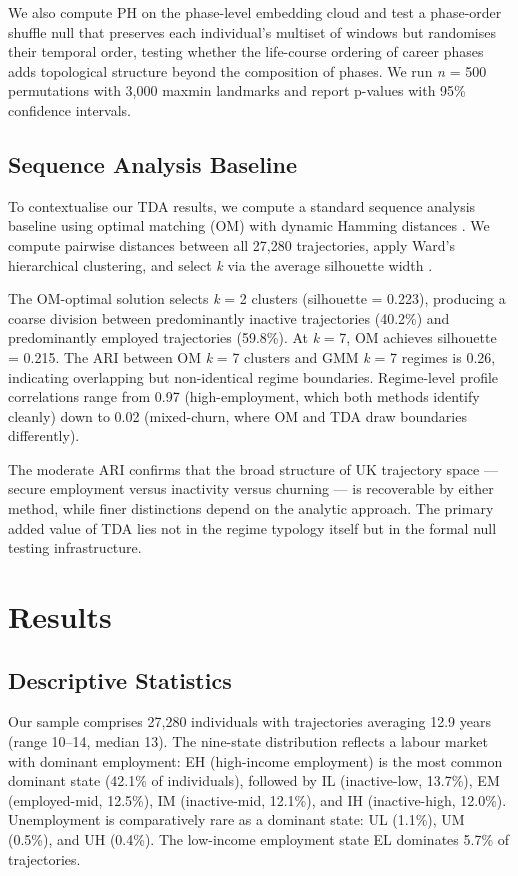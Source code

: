 We also compute PH on the phase-level embedding cloud and test a phase-order shuffle null that preserves each individual's multiset of windows but randomises their temporal order, testing whether the life-course ordering of career phases adds topological structure beyond the composition of phases. We run \textit{n} = 500 permutations with 3,000 maxmin landmarks and report p-values with 95\% confidence intervals.

\subsection{Sequence Analysis Baseline}

To contextualise our TDA results, we compute a standard sequence analysis baseline using optimal matching (OM) with dynamic Hamming distances \citep{lesnard2010setting}. We compute pairwise distances between all 27,280 trajectories, apply Ward's hierarchical clustering, and select \textit{k} via the average silhouette width \citep{studer2016what}.

The OM-optimal solution selects \textit{k} = 2 clusters (silhouette = 0.223), producing a coarse division between predominantly inactive trajectories (40.2\%) and predominantly employed trajectories (59.8\%). At \textit{k} = 7, OM achieves silhouette = 0.215. The ARI between OM \textit{k} = 7 clusters and GMM \textit{k} = 7 regimes is 0.26, indicating overlapping but non-identical regime boundaries. Regime-level profile correlations range from 0.97 (high-employment, which both methods identify cleanly) down to 0.02 (mixed-churn, where OM and TDA draw boundaries differently).

The moderate ARI confirms that the broad structure of UK trajectory space --- secure employment versus inactivity versus churning --- is recoverable by either method, while finer distinctions depend on the analytic approach. The primary added value of TDA lies not in the regime typology itself but in the formal null testing infrastructure.


\section{Results}

\subsection{Descriptive Statistics}

Our sample comprises 27,280 individuals with trajectories averaging 12.9 years (range 10--14, median 13). The nine-state distribution reflects a labour market with dominant employment: EH (high-income employment) is the most common dominant state (42.1\% of individuals), followed by IL (inactive-low, 13.7\%), EM (employed-mid, 12.5\%), IM (inactive-mid, 12.1\%), and IH (inactive-high, 12.0\%). Unemployment is comparatively rare as a dominant state: UL (1.1\%), UM (0.5\%), and UH (0.4\%). The low-income employment state EL dominates 5.7\% of trajectories.

